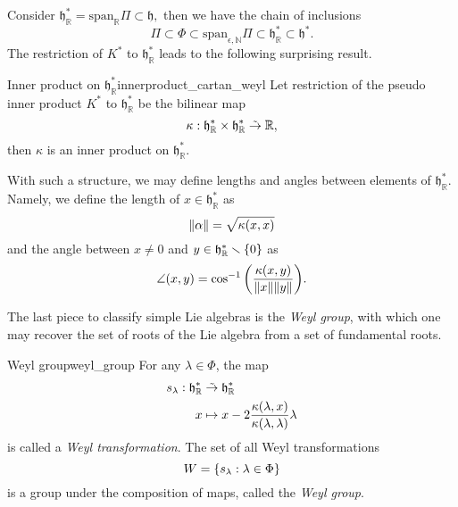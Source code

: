 Consider \(\mathfrak{h}_{\mathbb{R}}^{\ast} = \mathrm{span}_{\mathbb{R}}\Pi \subset \mathfrak{h}, \) then we have the chain of inclusions
\begin{equation*}
    \Pi \subset \Phi \subset \mathrm{span}_{\epsilon,\mathbb{N}}\Pi \subset \mathfrak{h}_{\mathbb{R}}^{\ast} \subset \mathfrak{h}^{\ast}.
\end{equation*}
The restriction of \(K ^{\ast}\) to \(\mathfrak{h}_{\mathbb{R}}^{\ast}\) leads to the following surprising result.
\begin{theorem}{Inner product on \(\mathfrak{h}_{\mathbb{R}}^{\ast}\)}{innerproduct_cartan_weyl}
    Let restriction of the pseudo inner product \(K ^{\ast}\) to \(\mathfrak{h}_{\mathbb{R}}^{\ast}\) be the bilinear map
    \begin{equation*}
        \kappa : \mathfrak{h}_{\mathbb{R}}^{\ast} \times \mathfrak{h}_{\mathbb{R}}^{\ast} \mathrel{\tilde{\to}} \mathbb{R},
    \end{equation*}
    then \(\kappa\) is an inner product on \(\mathfrak{h}_{\mathbb{R}}^{\ast}.\)
\end{theorem}

With such a structure, we may define lengths and angles between elements of \(\mathfrak{h}_{\mathbb{R}}^{\ast}.\) Namely, we define the length of \(x \in \mathfrak{h}_{\mathbb{R}}^{\ast}\) as
\begin{equation*}
    \lVert\alpha\rVert = \sqrt{\kappa(x, x)}
\end{equation*}
and the angle between \(x \neq 0\) and \(y \in \mathfrak{h}_{\mathbb{R}}^{\ast} \smallsetminus \{0\}\) as
\begin{equation*}
    \angle(x,y) = \cos^{-1}{\left(\frac{\kappa(x,y)}{\lVert x\rVert\lVert y\rVert}\right)}.
\end{equation*}

The last piece to classify simple Lie algebras is the \emph{Weyl group}, with which one may recover the set of roots of the Lie algebra from a set of fundamental roots.
\begin{definition}{Weyl group}{weyl_group}
    For any \(\lambda \in \Phi\), the map
    \begin{align*}
        s_{\lambda} : \mathfrak{h}_{\mathbb{R}}^{\ast} &\mathrel{\tilde{\to}} \mathfrak{h}_{\mathbb{R}}^{\ast}\\
                                                     x &\mapsto x - 2\frac{\kappa(\lambda, x)}{\kappa(\lambda, \lambda)}\lambda
    \end{align*}
    is called a \emph{Weyl transformation}. The set of all Weyl transformations
    \begin{equation*}
        W = \{s_{\lambda} : \lambda \in \Phi\}
    \end{equation*}
    is a group under the composition of maps, called the \emph{Weyl group}.
\end{definition}

